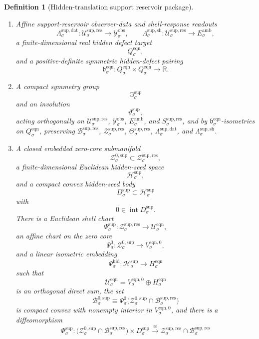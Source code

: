 \documentclass[11pt]{article}
\newcommand{\DataSpace}[1]{\mathcal Y_{#1}^{\mathrm{obs}}}
\newcommand{\AmbientTarget}[1]{E_{#1}^{\mathrm{amb}}}
\newcommand{\EqnSpace}[1]{\mathcal U_{#1}^{\mathrm{eqn}}}
\newcommand{\EqnTarget}[1]{Q_{#1}^{\mathrm{eqn}}}
\newcommand{\EqnPair}[1]{\mathfrak b_{#1}^{\mathrm{eqn}}}
\newcommand{\EqnZero}[1]{V_{#1}^{\mathrm{eqn},0}}
\newcommand{\EqnHidden}[1]{H_{#1}^{\mathrm{eqn}}}
\newcommand{\ResSpace}[1]{\mathcal U_{#1}^{\mathrm{sup,res}}}
\newcommand{\ResBody}[1]{\mathcal B_{#1}^{\mathrm{sup,res}}}
\newcommand{\ResTarget}[1]{S_{#1}^{\mathrm{sup,res}}}
\newcommand{\ResSection}[1]{\Theta_{#1}^{\mathrm{sup,res}}}
\newcommand{\ResShellSet}[1]{\mathcal Z_{#1}^{\mathrm{sup,res}}}
\newcommand{\ResData}[1]{\Lambda_{#1}^{\mathrm{sup,dat}}}
\newcommand{\ResShellMap}[1]{\Lambda_{#1}^{\mathrm{sup,sh}}}
\newcommand{\ResSym}[1]{\mathbb G_{#1}^{\mathrm{sup}}}
\newcommand{\ResTime}[1]{\vartheta_{#1}^{\mathrm{sup}}}
\newcommand{\ResZeroCore}[1]{\mathcal Z_{#1}^{0,\mathrm{sup}}}
\newcommand{\SeedHidden}[1]{\mathcal H_{#1}^{\mathrm{sup}}}
\newcommand{\SeedHiddenBody}[1]{D_{#1}^{\mathrm{sup}}}
\newcommand{\ShellChart}[1]{\Psi_{#1}^{\mathrm{sup}}}
\newcommand{\ZeroChart}[1]{\Psi_{#1}^{0}}
\newcommand{\HiddenChart}[1]{\Psi_{#1}^{\mathrm{hid}}}
\newcommand{\SplitMap}[1]{\Phi_{#1}^{\mathrm{sup}}}
\newcommand{\ZeroBody}[1]{\mathcal B_{#1}^{0,\mathrm{sup}}}
\newtheorem{definition}{Definition}
\begin{document}
\begin{definition}[Hidden-translation support reservoir package]
\begin{enumerate}
\begin{equation}
    \text{for all }v\in\ResBody{\sigma}.
    \label{eq:reservoirnormalcoercive}
    \end{equation}
    \item Affine support-reservoir observer-data and shell-response readouts
    \[
    \ResData{\sigma}:\ResSpace{\sigma}\to\DataSpace{\sigma},
    \qquad
    \ResShellMap{\sigma}:\ResSpace{\sigma}\to\AmbientTarget{\sigma},
    \]
    a finite-dimensional real hidden defect target
    \[
    \EqnTarget{\sigma},
    \]
    and a positive-definite symmetric hidden-defect pairing
    \[
    \EqnPair{\sigma}:
    \EqnTarget{\sigma}\times\EqnTarget{\sigma}\to\mathbb R.
    \]
    \item A compact symmetry group
    \[
    \ResSym{\sigma}
    \]
    and an involution
    \[
    \ResTime{\sigma},
    \]
    acting orthogonally on \(\ResSpace{\sigma}\), \(\DataSpace{\sigma}\), \(\AmbientTarget{\sigma}\), and \(\ResTarget{\sigma}\), and by \(\EqnPair{\sigma}\)-isometries on \(\EqnTarget{\sigma}\), preserving \(\ResBody{\sigma}\), \(\ResShellSet{\sigma}\), \(\ResSection{\sigma}\), \(\ResData{\sigma}\), and \(\ResShellMap{\sigma}\).
    \item A closed embedded zero-core submanifold
    \[
    \ResZeroCore{\sigma}\subset\ResShellSet{\sigma},
    \]
    a finite-dimensional Euclidean hidden-seed space
    \[
    \SeedHidden{\sigma},
    \]
    and a compact convex hidden-seed body
    \[
    \SeedHiddenBody{\sigma}\subset\SeedHidden{\sigma}
    \]
    with
    \[
    0\in\operatorname{int}\SeedHiddenBody{\sigma}.
    \]
    There is a Euclidean shell chart
    \[
    \ShellChart{\sigma}:\ResShellSet{\sigma}\to\EqnSpace{\sigma},
    \]
    an affine chart on the zero core
    \[
    \ZeroChart{\sigma}:\ResZeroCore{\sigma}\to\EqnZero{\sigma},
    \]
    and a linear isometric embedding
    \[
    \HiddenChart{\sigma}:\SeedHidden{\sigma}\to\EqnHidden{\sigma}
    \]
    such that
    \[
    \EqnSpace{\sigma}
    =
    \EqnZero{\sigma}\oplus\EqnHidden{\sigma}
    \]
    is an orthogonal direct sum, the set
    \[
    \ZeroBody{\sigma}
    \equiv
    \ZeroChart{\sigma}\bigl(\ResZeroCore{\sigma}\cap\ResBody{\sigma}\bigr)
    \]
    is compact convex with nonempty interior in \(\EqnZero{\sigma}\), and there is a diffeomorphism
    \begin{equation}
    \SplitMap{\sigma}:
    \bigl(\ResZeroCore{\sigma}\cap\ResBody{\sigma}\bigr)
    \times
    \SeedHiddenBody{\sigma}
    \xrightarrow{\cong}
    \ResShellSet{\sigma}\cap\ResBody{\sigma}
    \label{eq:splitmap}
    \end{equation}

\end{enumerate}
\end{definition}
\end{document}
